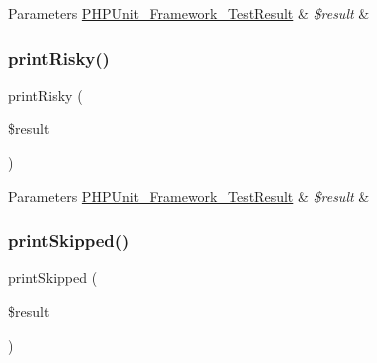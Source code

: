 \begin{DoxyParams}[1]{Parameters}
\mbox{\hyperlink{class_p_h_p_unit___framework___test_result}{P\+H\+P\+Unit\+\_\+\+Framework\+\_\+\+Test\+Result}} & {\em \$result} & \\
\hline
\end{DoxyParams}
\mbox{\label{class_p_h_p_unit___text_u_i___result_printer_a8937854917d76a1807f303c3a4e70fb6}} 
\subsubsection{\texorpdfstring{print\+Risky()}{printRisky()}}
{\footnotesize\ttfamily print\+Risky (\begin{DoxyParamCaption}\item[{\mbox{\hyperlink{class_p_h_p_unit___framework___test_result}{P\+H\+P\+Unit\+\_\+\+Framework\+\_\+\+Test\+Result}}}]{\$result }\end{DoxyParamCaption})\hspace{0.3cm}{\ttfamily [protected]}}


\begin{DoxyParams}[1]{Parameters}
\mbox{\hyperlink{class_p_h_p_unit___framework___test_result}{P\+H\+P\+Unit\+\_\+\+Framework\+\_\+\+Test\+Result}} & {\em \$result} & \\
\hline
\end{DoxyParams}
\mbox{\label{class_p_h_p_unit___text_u_i___result_printer_ac16d9225f88dcfaf22a86d7ba527c913}} 
\subsubsection{\texorpdfstring{print\+Skipped()}{printSkipped()}}
{\footnotesize\ttfamily print\+Skipped (\begin{DoxyParamCaption}\item[{\mbox{\hyperlink{class_p_h_p_unit___framework___test_result}{P\+H\+P\+Unit\+\_\+\+Framework\+\_\+\+Test\+Result}}}]{\$result }\end{DoxyParamCaption})\hspace{0.3cm}{\ttfamily [protected]}}


